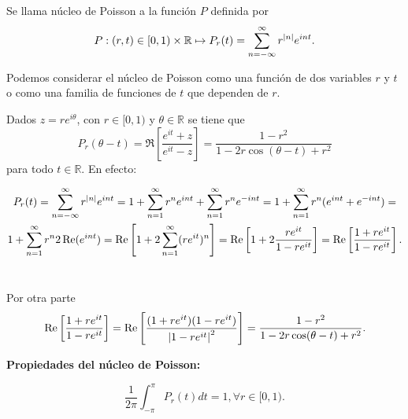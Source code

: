 \begin{definition}
    Se llama núcleo de Poisson a la función $P$ definida por
    \begin{equation}
        \label{poisson1}
        P:(r,t) \in [0,1)\times \mathbb{R} \mapsto P_r(t) = \sum_{n=-\infty}^{\infty} r^{\left\lvert n\right\rvert}e^{int}.
    \end{equation}

    Podemos considerar el núcleo de Poisson como una función de dos variables $r$ y $t$ o como una familia de funciones de $t$ que dependen de $r$.

    Dados $z=re^{i \theta}$, con $r \in [0,1)$ y $\theta \in \mathbb{R}$ se tiene que
    \begin{equation}
    \label{poisson2}
        P_r(\theta - t) = \Re \left[ \dfrac{e^{it} + z}{e^{it} - z} \right] = \dfrac{1 - r^2}{1 - 2r \cos (\theta - t) + r^2}
    \end{equation}
    para todo $t \in \mathbb{R}$. En efecto:

    \begin{multline*}
        P_r(t) = \sum_{n=-\infty}^{\infty} r^{\left\lvert n\right\rvert}e^{int} = 1 + \sum_{n=1}^{\infty} r^n e^{int} + \sum_{n=1}^{\infty} r^n e^{-int} = 1 + \sum_{n=1}^{\infty} r^n (e^{int} + e^{-int}) = \\
        1 + \sum_{n=1}^{\infty} r^n 2 \operatorname{Re}(e^{int}) = \operatorname{Re} \left[ 1 + 2 \sum_{n=1}^{\infty} (r e^{it})^n  \right] = \operatorname{Re} \left[ 1 + 2 \dfrac{re^{it}}{1-re^{it}} \right] = \operatorname{Re} \left[\dfrac{1 + re^{it}}{1-re^{it}} \right].
    \end{multline*}
    \\ \par
    Por otra parte
    \begin{equation*}
        \operatorname{Re} \left[ \dfrac{1 + re^{it}}{1-re^{it}} \right] = \operatorname{Re} \left[ \dfrac{(1 + re^{it})(1 - re^{it})}{\left\lvert1-re^{it}\right\rvert^2} \right] = \dfrac{1 - r^2}{1 - 2r \cos (\theta - t) + r^2}.
    \end{equation*}
\end{definition}

\newpage

\textbf{Propiedades del núcleo de Poisson:}%

\begin{equation}
    \dfrac{1}{2 \pi} \int_{- \pi}^{\pi} P_r (t) dt = 1, \forall r \in [0,1).
\end{equation}

